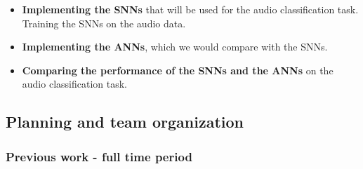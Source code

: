 \documentclass[11pt]{article}
\begin{document}
\begin{itemize}
  \item \textbf{Implementing the SNNs} that will be used for the audio classification task.
        \subitem Training the SNNs on the audio data.
  \item \textbf{Implementing the ANNs}, which we would compare with the SNNs.
  \item \textbf{Comparing the performance of the SNNs and the ANNs} on the audio classification task.
\end{itemize}

\pagebreak

\subsection{Planning and team organization}

\subsubsection{Previous work - full time period}
\end{document}
